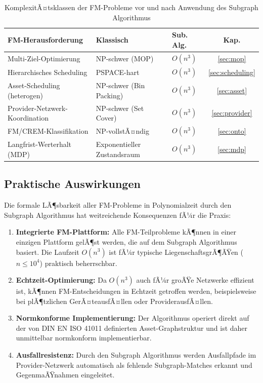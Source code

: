 ﻿\documentclass[a4paper,12pt]{article}
\theoremstyle{definition}
\begin{document}
\begin{table}[h]
\centering
\caption{KomplexitÃ¤tsklassen der FM-Probleme vor und nach Anwendung des Subgraph Algorithmus}
\label{tab:komplex}
\begin{tabular}{lllc}
\toprule
\textbf{FM-Herausforderung} & \textbf{Klassisch} & \textbf{Sub. Alg.} & \textbf{Kap.} \\
\midrule
Multi-Ziel-Optimierung & NP-schwer (MOP) & $O(n^3)$ & \ref{sec:mop} \\
Hierarchisches Scheduling & PSPACE-hart & $O(n^3)$ & \ref{sec:scheduling} \\
Asset-Scheduling (heterogen) & NP-schwer (Bin Packing) & $O(n^3)$ & \ref{sec:asset} \\
Provider-Netzwerk-Koordination & NP-schwer (Set Cover) & $O(n^3)$ & \ref{sec:provider} \\
FM/CREM-Klassifikation & NP-vollstÃ¤ndig & $O(n^3)$ & \ref{sec:onto} \\
Langfrist-Werterhalt (MDP) & Exponentieller Zustandsraum & $O(n^3)$ & \ref{sec:mdp} \\
\bottomrule
\end{tabular}
\end{table}

\subsection{Praktische Auswirkungen}

Die formale LÃ¶sbarkeit aller FM-Probleme in Polynomialzeit durch den
Subgraph Algorithmus hat weitreichende Konsequenzen fÃ¼r die Praxis:

\begin{enumerate}
    \item \textbf{Integrierte FM-Plattform:} Alle FM-Teilprobleme kÃ¶nnen in einer
          einzigen Plattform gelÃ¶st werden, die auf dem Subgraph Algorithmus basiert.
          Die Laufzeit $O(n^3)$ ist fÃ¼r typische LiegenschaftsgrÃ¶ÃŸen ($n \leq 10^4$)
          praktisch beherrschbar.

    \item \textbf{Echtzeit-Optimierung:} Da $O(n^3)$ auch fÃ¼r groÃŸe Netzwerke
          effizient ist, kÃ¶nnen FM-Entscheidungen in Echtzeit getroffen werden,
          beispielsweise bei plÃ¶tzlichen GerÃ¤teausfÃ¤llen oder ProviderausfÃ¤llen.

    \item \textbf{Normkonforme Implementierung:} Der Algorithmus operiert direkt
          auf der von DIN EN ISO 41011 definierten Asset-Graphstruktur und ist
          daher unmittelbar normkonform implementierbar.

    \item \textbf{Ausfallresistenz:} Durch den Subgraph Algorithmus werden
          Ausfallpfade im Provider-Netzwerk automatisch als fehlende Subgraph-Matches
          erkannt und GegenmaÃŸnahmen eingeleitet.
\end{enumerate}
\end{document}
